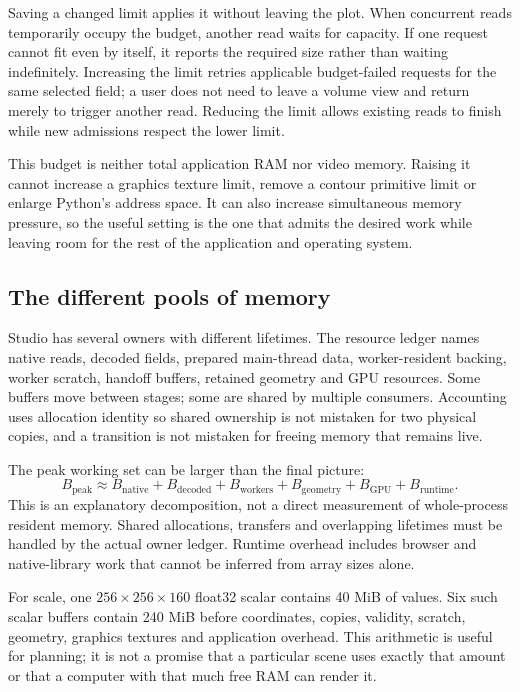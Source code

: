 Saving a changed limit applies it without leaving the plot. When concurrent
reads temporarily occupy the budget, another read waits for capacity. If one
request cannot fit even by itself, it reports the required size rather than
waiting indefinitely. Increasing the limit retries applicable budget-failed
requests for the same selected field; a user does not need to leave a volume
view and return merely to trigger another read. Reducing the limit allows
existing reads to finish while new admissions respect the lower limit.

This budget is neither total application RAM nor video memory. Raising it cannot
increase a graphics texture limit, remove a contour primitive limit or enlarge
Python's address space. It can also increase simultaneous memory pressure, so
the useful setting is the one that admits the desired work while leaving room
for the rest of the application and operating system.

\subsection{The different pools of memory}
Studio has several owners with different lifetimes. The resource ledger names
native reads, decoded fields, prepared main-thread data, worker-resident backing,
worker scratch, handoff buffers, retained geometry and GPU resources. Some
buffers move between stages; some are shared by multiple consumers. Accounting
uses allocation identity so shared ownership is not mistaken for two physical
copies, and a transition is not mistaken for freeing memory that remains live.

The peak working set can be larger than the final picture:
\begin{equation}
 B_{\mathrm{peak}} \approx B_{\mathrm{native}}+B_{\mathrm{decoded}}
  +B_{\mathrm{workers}}+B_{\mathrm{geometry}}+B_{\mathrm{GPU}}
  +B_{\mathrm{runtime}}.
\end{equation}
This is an explanatory decomposition, not a direct measurement of whole-process
resident memory. Shared allocations, transfers and overlapping lifetimes must
be handled by the actual owner ledger. Runtime overhead includes browser and
native-library work that cannot be inferred from array sizes alone.

For scale, one $256\times256\times160$ float32 scalar contains 40 MiB of values.
Six such scalar buffers contain 240 MiB before coordinates, copies, validity,
scratch, geometry, graphics textures and application overhead. This arithmetic
is useful for planning; it is not a promise that a particular scene uses exactly
that amount or that a computer with that much free RAM can render it.

